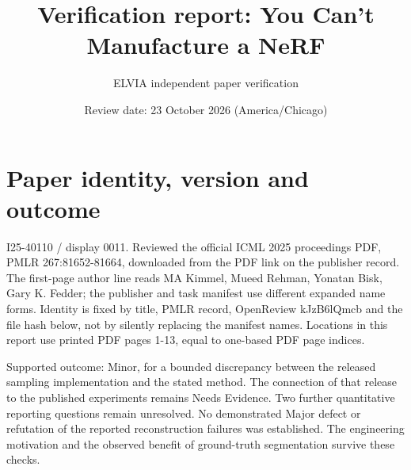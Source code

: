 \documentclass[10pt]{article}
\title{Verification report: You Can’t Manufacture a NeRF}
\author{ELVIA independent paper verification}
\date{Review date: 23 October 2026 (America/Chicago)}
\begin{document}
\maketitle
\section*{Paper identity, version and outcome}
I25-40110 / display 0011. Reviewed the official ICML 2025 proceedings PDF, PMLR 267:81652-81664, downloaded from the PDF link on the publisher record. The first-page author line reads MA Kimmel, Mueed Rehman, Yonatan Bisk, Gary K. Fedder; the publisher and task manifest use different expanded name forms. Identity is fixed by title, PMLR record, OpenReview kJzB6lQmcb and the file hash below, not by silently replacing the manifest names. Locations in this report use printed PDF pages 1-13, equal to one-based PDF page indices.\par
Supported outcome: Minor, for a bounded discrepancy between the released sampling implementation and the stated method. The connection of that release to the published experiments remains Needs Evidence. Two further quantitative reporting questions remain unresolved. No demonstrated Major defect or refutation of the reported reconstruction failures was established. The engineering motivation and the observed benefit of ground-truth segmentation survive these checks.\par
\end{document}
